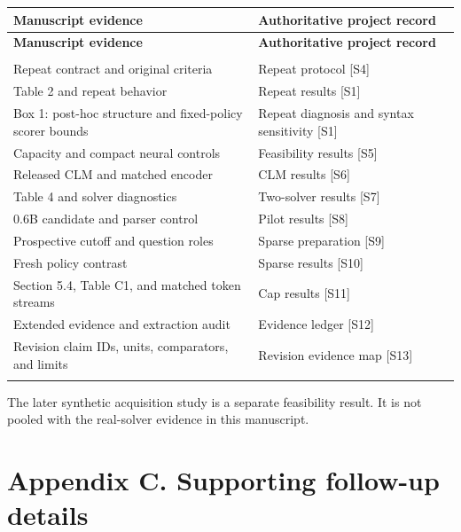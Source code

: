 \documentclass[11pt,a4paper]{article}
\begin{document}
\begingroup\nolinenumbers\small
\begin{longtable}{@{}>{\raggedright\arraybackslash}p{}>{\raggedright\arraybackslash}p{}@{}}
\toprule
\textbf{Manuscript evidence} & \textbf{Authoritative project record} \\
\midrule\endfirsthead
\toprule
\textbf{Manuscript evidence} & \textbf{Authoritative project record} \\
\midrule\endhead
\midrule\multicolumn{2}{r}{\footnotesize Continued on next page}\\\endfoot
\bottomrule\endlastfoot
Repeat contract and original criteria & Repeat protocol [S4] \\ \addlinespace[2pt]
Table 2 and repeat behavior & Repeat results [S1] \\ \addlinespace[2pt]
Box 1: post-hoc structure and fixed-policy scorer bounds & Repeat diagnosis and syntax sensitivity [S1] \\ \addlinespace[2pt]
Capacity and compact neural controls & Feasibility results [S5] \\ \addlinespace[2pt]
Released CLM and matched encoder & CLM results [S6] \\ \addlinespace[2pt]
Table 4 and solver diagnostics & Two-solver results [S7] \\ \addlinespace[2pt]
0.6B candidate and parser control & Pilot results [S8] \\ \addlinespace[2pt]
Prospective cutoff and question roles & Sparse preparation [S9] \\ \addlinespace[2pt]
Fresh policy contrast & Sparse results [S10] \\ \addlinespace[2pt]
Section 5.4, Table C1, and matched token streams & Cap results [S11] \\ \addlinespace[2pt]
Extended evidence and extraction audit & Evidence ledger [S12] \\ \addlinespace[2pt]
Revision claim IDs, units, comparators, and limits & Revision evidence map [S13] \\ \addlinespace[2pt]
\end{longtable}
\endgroup\linenumbers
The later synthetic acquisition study is a separate feasibility result. It is not pooled with the real-solver evidence in this manuscript.

\section*{Appendix C. Supporting follow-up details}\label{sec:appendix-c-supporting-follow-up-details}
\end{document}
